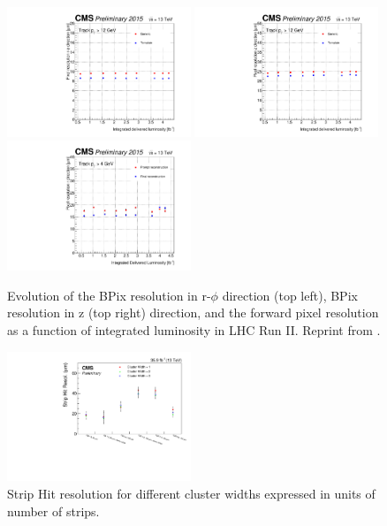 \documentclass[thesis.tex]{subfiles}
\begin{document}
\begin{figure}[!htb]
	\centering
	\includegraphics[width=0.49\textwidth]{Fig/LumiPlot_x_GenericVsTemplate_ReReco_3.pdf}
	\includegraphics[width=0.49\textwidth]{Fig/LumiPlot_y_GenericVsTemplate_ReReco_3.pdf} \\
	\includegraphics[width=0.49\textwidth]{Fig/LuminosityHistoryPlot_all_template.pdf}
	\caption{Evolution of the BPix resolution in r-$\phi$ direction (top left), BPix resolution in z (top right) direction, and the forward pixel resolution as a function of integrated luminosity in LHC Run II. Reprint from \cite{PixelPerformance}.}
	\label{fig:pixelreso}
\end{figure}

\begin{figure}[!htb]
	\centering
	\includegraphics[width=0.49\textwidth]{Fig/StripHitRes.pdf}
	\caption{Strip Hit resolution for different cluster widths expressed in units of number of strips. }
	\label{fig:stripreso}
\end{figure}
\end{document}
